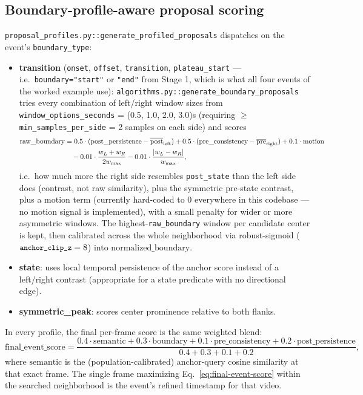 \documentclass[11pt]{article}
\newcommand{\code}[1]{\texttt{\small #1}}
\newcommand{\file}[1]{\texttt{\footnotesize #1}}
\begin{document}
\subsection{Boundary-profile-aware proposal scoring}
\file{proposal\_profiles.py::generate\_profiled\_proposals} dispatches on the
event's \code{boundary\_type}:
\begin{itemize}[nosep]
  \item \textbf{transition} (\code{onset}, \code{offset}, \code{transition},
    \code{plateau\_start} --- i.e.\ \code{boundary="start"} or
    \code{"end"} from Stage 1, which is what all four events of the worked
    example use): \code{algorithms.py::generate\_boundary\_proposals}
    tries every combination of left/right window sizes from
    \code{window\_options\_seconds} = (0.5, 1.0, 2.0, 3.0)s (requiring
    $\ge$ \code{min\_samples\_per\_side} = 2 samples on each side) and scores
    \begin{align}
      \mathrm{raw\_boundary} &= 0.5 \cdot (\mathrm{post\_persistence} -
        \overline{\mathrm{post}}_{\mathrm{left}})
        + 0.5 \cdot (\mathrm{pre\_consistency} - \overline{\mathrm{pre}}_{\mathrm{right}})
        + 0.1 \cdot \mathrm{motion} \notag\\
        &\quad - 0.01\cdot\frac{w_L+w_R}{2 w_{\max}}
        - 0.01\cdot\frac{|w_L-w_R|}{w_{\max}},
    \end{align}
    i.e.\ how much more the right side resembles \code{post\_state} than the
    left side does (contrast, not raw similarity), plus the symmetric
    pre-state contrast, plus a motion term (currently hard-coded to 0
    everywhere in this codebase --- no motion signal is implemented), with a
    small penalty for wider or more asymmetric windows. The
    highest-\code{raw\_boundary} window per candidate center is kept, then
    calibrated across the whole neighborhood via robust-sigmoid
    ($\code{anchor\_clip\_z} = 8$) into $\mathrm{normalized\_boundary}$.
  \item \textbf{state}: uses local temporal persistence of the anchor score
    instead of a left/right contrast (appropriate for a state predicate with
    no directional edge).
  \item \textbf{symmetric\_peak}: scores center prominence relative to both
    flanks.
\end{itemize}
In every profile, the final per-frame score is the same weighted blend:
\begin{equation}
  \mathrm{final\_event\_score} = \frac{
    0.4 \cdot \mathrm{semantic} + 0.3\cdot\mathrm{boundary}
    + 0.1\cdot\mathrm{pre\_consistency} + 0.2\cdot\mathrm{post\_persistence}
  }{0.4+0.3+0.1+0.2},
  \label{eq:final-event-score}
\end{equation}
where $\mathrm{semantic}$ is the (population-calibrated) anchor-query cosine
similarity at that exact frame. The single frame maximizing
Eq.~\ref{eq:final-event-score} within the searched neighborhood is the
event's refined timestamp for that video.
\end{document}
